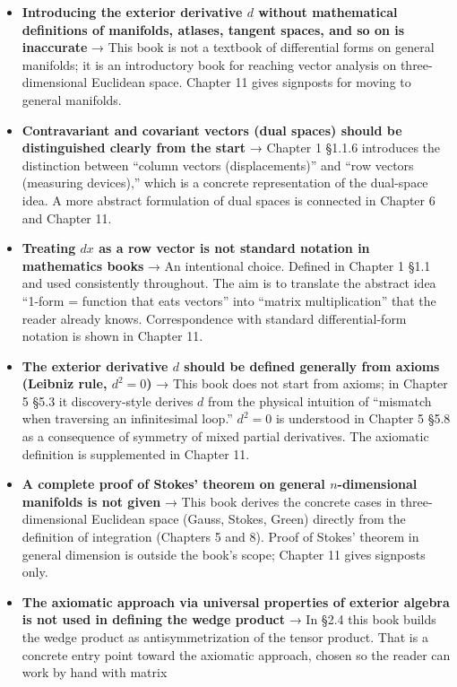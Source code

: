 \begin{itemize}
\item
  \textbf{Introducing the exterior derivative $d$ without mathematical definitions of manifolds, atlases, tangent spaces, and so on is inaccurate}
  → This book is not a textbook of differential forms on general
  manifolds; it is an introductory book for reaching vector analysis on
  three-dimensional Euclidean space. Chapter 11 gives signposts for
  moving to general manifolds.
\item
  \textbf{Contravariant and covariant vectors (dual spaces) should be distinguished clearly from the start}
  → Chapter 1 §1.1.6 introduces the distinction between ``column vectors
  (displacements)'' and ``row vectors (measuring devices),'' which is a
  concrete representation of the dual-space idea. A more abstract
  formulation of dual spaces is connected in Chapter 6 and Chapter 11.
\item
  \textbf{Treating $dx$ as a row vector is not standard notation in mathematics books}
  → An intentional choice. Defined in Chapter 1 §1.1 and used
  consistently throughout. The aim is to translate the abstract idea
  ``1-form = function that eats vectors'' into ``matrix multiplication''
  that the reader already knows. Correspondence with standard
  differential-form notation is shown in Chapter 11.
\item
  \textbf{The exterior derivative $d$ should be defined generally from axioms (Leibniz rule, $d^2=0$)}
  → This book does not start from axioms; in Chapter 5 §5.3 it
  discovery-style derives \(d\) from the physical intuition of
  ``mismatch when traversing an infinitesimal loop.'' \(d^2=0\) is
  understood in Chapter 5 §5.8 as a consequence of symmetry of mixed
  partial derivatives. The axiomatic definition is supplemented in
  Chapter 11.
\item
  \textbf{A complete proof of Stokes' theorem on general $n$-dimensional manifolds is not given}
  → This book derives the concrete cases in three-dimensional Euclidean
  space (Gauss, Stokes, Green) directly from the definition of
  integration (Chapters 5 and 8). Proof of Stokes' theorem in general
  dimension is outside the book's scope; Chapter 11 gives signposts
  only.
\item
  \textbf{The axiomatic approach via universal properties of exterior algebra is not used in defining the wedge product}
  → In §2.4 this book builds the wedge product as antisymmetrization of
  the tensor product. That is a concrete entry point toward the
  axiomatic approach, chosen so the reader can work by hand with matrix

\end{itemize}
